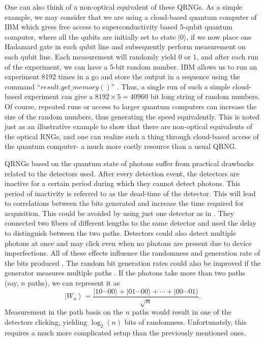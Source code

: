 \documentclass[]{interact}
\theoremstyle{plain}%
\theoremstyle{definition}
\theoremstyle{remark}
\begin{document}
One can also think of a non-optical equivalent of these QRNGs. As a simple example, we may consider that we are using a cloud-based quantum computer of IBM \cite{IBMQ} which gives free access to superconductivity based 5-qubit quantum computer, where all the qubits are initially set to state $|0\rangle$, if we now place one Hadamard gate in each qubit line and subsequently perform measurement on each qubit line. Each measurement will randomly yield 0 or 1, and after each run of the experiment, we can have a 5-bit random number. IBM allows us to run an experiment 8192 times in a go and store the output in a sequence using the command  ``$result.get\_memory()$'' \cite{qiskit}. Thus, a single run of such a simple cloud-based experiment can give a $8192\times5=40960$ bit long string of random numbers. Of course, repeated runs or access to larger quantum computers can increase the size of the random numbers, thus generating the speed equivalently. This is noted just as an illustrative example to show that there are non-optical equivalents of the optical RNGs, and one can realize such a thing through cloud-based access of the quantum computer- a much more costly resource than a usual QRNG.

QRNGs based on the quantum state of photons suffer from practical drawbacks related to the detectors used. After every detection event, the detectors are inactive for a certain period during which they cannot detect photons. This period of inactivity is referred to as the dead-time of the detector. This will lead to correlations between the bits generated and increase the time required for acquisition. This could be avoided by using just one detector as in \cite{Stefanov_2000}. They connected two fibers of different lengths to the same detector and used the delay to distinguish between the two paths. Detectors could also detect multiple photons at once and may click even when no photons are present due to device imperfections. All of these effects influence the randomness and generation rate of the bits produced \cite{jennewein2000fast,rarity1994quantum,soubusta2003experimental,ManliXu2015,bronner2009demonstrating}. The random bit generation rates could also be improved if the
generator measures multiple paths \cite{grafe2014chip}. If the photons take more than two paths (say, $n$ paths), we can represent it as
$$
\left|W_{n}\right\rangle=\frac{|10 \cdots 00\rangle+|01 \cdots 00\rangle+\cdots+|00 \cdots 01\rangle}{\sqrt{n}}.
$$
Measurement in the path basis on the $n$ paths would result in one of the detectors clicking, yielding  $\log_2(n)$ bits of randomness. Unfortunately, this requires a much more complicated setup than the previously mentioned ones.
\end{document}
